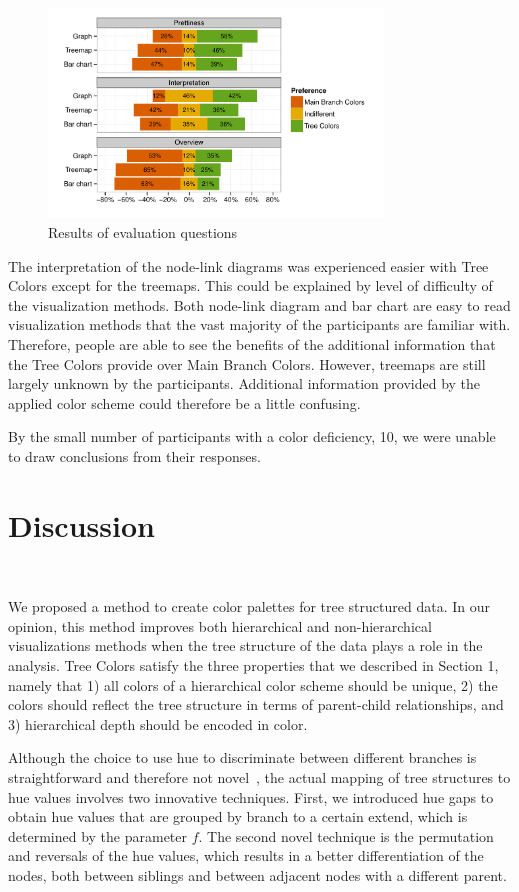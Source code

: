 \documentclass[review,journal]{vgtc}         %
\begin{document}
\begin{figure}[tb]
  \centering
	\includegraphics[width=3.5in]{user_study_results2.pdf}
  \caption{Results of evaluation questions}\label{fig:user2}
\end{figure}


The interpretation of the node-link diagrams was experienced easier with Tree Colors except for the treemaps. This could be explained by level of difficulty of the visualization methods. Both node-link diagram and bar chart are easy to read visualization methods that the vast majority of the participants are familiar with. Therefore, people are able to see the benefits of the additional information that the Tree Colors provide over Main Branch Colors. However, treemaps are still largely unknown by the participants. Additional information provided by the applied color scheme could therefore be a little confusing.

By the small number of participants with a color deficiency, 10, we were unable to draw conclusions from their responses.


\section{Discussion}~\label{secdisc}

We proposed a method to create color palettes for tree structured data. In our opinion, this method improves both hierarchical and non-hierarchical visualizations methods when the tree structure of the data plays a role in the analysis. Tree Colors satisfy the three properties that we described in Section 1, namely that 1) all colors of a hierarchical color scheme should be unique, 2) the colors should reflect the tree structure in terms of parent-child relationships, and 3) hierarchical depth should be encoded in color. 

Although the choice to use hue to discriminate between different branches is straightforward and therefore not novel~\cite{yang2002, lam2012}, the actual mapping of tree structures to hue values involves two innovative techniques. First, we introduced hue gaps to obtain hue values that are grouped by branch to a certain extend, which is determined by the parameter $f$. The second novel technique is the permutation and reversals of the hue values, which results in a better differentiation of the nodes, both between siblings and between adjacent nodes with a different parent.
\end{document}
